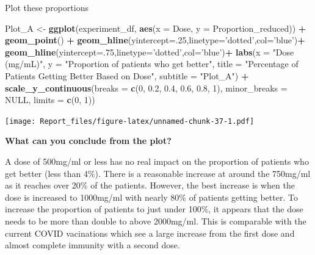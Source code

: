 \documentclass[
]{article}
\newenvironment{Shaded}{\begin{snugshade}}{\end{snugshade}}
\newcommand{\DataTypeTok}[1]{\textcolor[rgb]{0.13,0.29,0.53}{#1}}
\newcommand{\DecValTok}[1]{\textcolor[rgb]{0.00,0.00,0.81}{#1}}
\newcommand{\FloatTok}[1]{\textcolor[rgb]{0.00,0.00,0.81}{#1}}
\newcommand{\KeywordTok}[1]{\textcolor[rgb]{0.13,0.29,0.53}{\textbf{#1}}}
\newcommand{\NormalTok}[1]{#1}
\newcommand{\OperatorTok}[1]{\textcolor[rgb]{0.81,0.36,0.00}{\textbf{#1}}}
\newcommand{\OtherTok}[1]{\textcolor[rgb]{0.56,0.35,0.01}{#1}}
\newcommand{\StringTok}[1]{\textcolor[rgb]{0.31,0.60,0.02}{#1}}
\begin{document}
Plot these proportions

\begin{Shaded}
\begin{Highlighting}[]
\NormalTok{Plot_A <-}\StringTok{ }
\StringTok{  }\KeywordTok{ggplot}\NormalTok{(experiment_df, }\KeywordTok{aes}\NormalTok{(}\DataTypeTok{x =}\NormalTok{ Dose, }\DataTypeTok{y =}\NormalTok{ Proportion_reduced)) }\OperatorTok{+}
\StringTok{    }\KeywordTok{geom_point}\NormalTok{() }\OperatorTok{+}
\StringTok{    }\KeywordTok{geom_hline}\NormalTok{(}\DataTypeTok{yintercept=}\NormalTok{.}\DecValTok{25}\NormalTok{,}\DataTypeTok{linetype=}\StringTok{'dotted'}\NormalTok{,}\DataTypeTok{col=}\StringTok{'blue'}\NormalTok{)}\OperatorTok{+}
\StringTok{    }\KeywordTok{geom_hline}\NormalTok{(}\DataTypeTok{yintercept=}\NormalTok{.}\DecValTok{75}\NormalTok{,}\DataTypeTok{linetype=}\StringTok{'dotted'}\NormalTok{,}\DataTypeTok{col=}\StringTok{'blue'}\NormalTok{)}\OperatorTok{+}
\StringTok{    }\KeywordTok{labs}\NormalTok{(}\DataTypeTok{x =} \StringTok{"Dose (mg/mL)"}\NormalTok{,}
          \DataTypeTok{y =} \StringTok{"Proportion of patients who get better"}\NormalTok{,}
          \DataTypeTok{title =} \StringTok{"Percentage of Patients Getting Better Based on Dose"}\NormalTok{,}
          \DataTypeTok{subtitle =} \StringTok{"Plot_A"}\NormalTok{) }\OperatorTok{+}
\StringTok{    }\KeywordTok{scale_y_continuous}\NormalTok{(}\DataTypeTok{breaks =} \KeywordTok{c}\NormalTok{(}\DecValTok{0}\NormalTok{, }\FloatTok{0.2}\NormalTok{, }\FloatTok{0.4}\NormalTok{, }\FloatTok{0.6}\NormalTok{, }\FloatTok{0.8}\NormalTok{, }\DecValTok{1}\NormalTok{),}
                        \DataTypeTok{minor_breaks =} \OtherTok{NULL}\NormalTok{,}
                        \DataTypeTok{limits =} \KeywordTok{c}\NormalTok{(}\DecValTok{0}\NormalTok{, }\DecValTok{1}\NormalTok{))}
\end{Highlighting}
\end{Shaded}

\texttt{[image: Report\_files/figure-latex/unnamed-chunk-37-1.pdf]}

\textbf{What can you conclude from the plot?}

A dose of 500mg/ml or less has no real impact on the proportion of
patients who get better (less than 4\%). There is a reasonable increase
at around the 750mg/ml as it reaches over 20\% of the patients. However,
the best increase is when the dose is increased to 1000mg/ml with nearly
80\% of patients getting better. To increase the proportion of patients
to just under 100\%, it appears that the dose needs to be more than
double to above 2000mg/ml. This is comparable with the current COVID
vacinations which see a large increase from the first dose and almost
complete immunity with a second dose.
\end{document}
